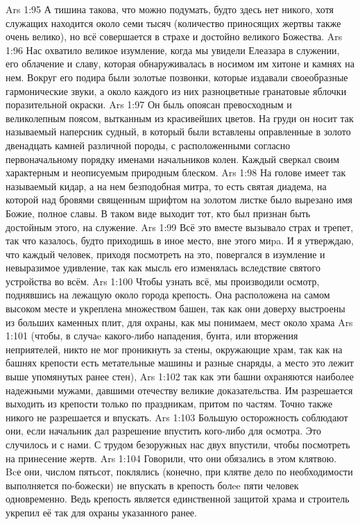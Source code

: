 \vs Ars 1:95
А тишина такова, что можно подумать, будто здесь нет никого, хотя служащих находится около семи тысяч (количество приносящих жертвы также очень велико), но всё совершается в страхе и достойно великого Божества.
\vs Ars 1:96
Нас охватило великое изумление, когда мы увидели Елеазара в служении, его облачение и славу, которая обнаруживалась в носимом им хитоне и камнях на нем. Вокруг его подира были золотые позвонки, которые издавали своеобразные гармонические звуки, а около каждого из них разноцветные гранатовые яблочки поразительной окраски.
\vs Ars 1:97
Он быль опоясан превосходным и великолепным поясом, вытканным из красивейших цветов. На груди он носит так называемый наперсник судный, в который были вставлены оправленные в золото двенадцать камней различной породы, с расположенными согласно первоначальному порядку именами начальников колен. Каждый сверкал своим характерным и неописуемым природным блеском.
\vs Ars 1:98
На голове имеет так называемый кидар, а на нем безподобная митра, то есть святая диадема, на которой над бровями священным шрифтом на золотом листке было вырезано имя Божие, полное славы. В таком виде выходит тот, кто был признан быть достойным этого, на служение.
\vs Ars 1:99
Всё это вместе вызывало страх и трепет, так что казалось, будто приходишь в иное место, вне этого миpa. И я утверждаю, что каждый человек, приходя посмотреть на это, повергался в изумление и невыразимое удивление, так как мысль его изменялась вследствие святого устройства во всём.
\vs Ars 1:100
Чтобы узнать всё, мы производили осмотр, поднявшись на лежащую около города крепость. Она расположена на самом высоком месте и укреплена множеством башен, так как они доверху выстроены из больших каменных плит, для охраны, как мы понимаем, мест около храма
\vs Ars 1:101
(чтобы, в случаe какого-либо нападения, бунта, или вторжения неприятелей, никто не мог проникнуть за стены, окружающие храм, так как на башнях крепости есть метательные машины и разные снаряды, а место это лежит выше упомянутых ранее стен),
\vs Ars 1:102
так как эти башни охраняются наиболее надежными мужами, давшими отечеству великие доказательства. Им разрешается выходить из крепости только по праздникам, притом по частям. Точно также никого не разрешается и впускать.
\vs Ars 1:103
Большую осторожность соблюдают они, если начальник дал разрешение впустить кого-либо для осмотра. Это случилось и с нами. С трудом безоружных нас двух впустили, чтобы посмотреть на принесение жертв.
\vs Ars 1:104
Говорили, что они обязались в этом клятвою. Bcе они, числом пятьсот, поклялись (конечно, при клятве дело по необходимости выполняется по-божески) не впускать в крепость болee пяти человек одновременно. Ведь крепость является единственной защитой храма и строитель укрепил её так для охраны указанного ранее.
